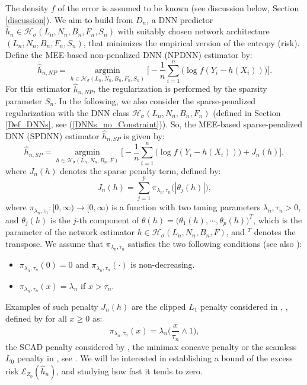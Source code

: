 \documentclass[10pt,twoside]{article}
\numberwithin{equation}{section}
\DeclareMathOperator*{\argmin}{argmin}
\begin{document}
The density $f$ of the error is assumed to be known (see discussion below, Section \ref{discussion}).
%
We aim to build from $D_n$, a DNN predictor $\widehat{h}_n \in \mathcal{H}_{\sigma}(L_n, N_n, B_n, F_n, S_n)$ with suitably chosen network architecture $(L_n, N_n, B_n, F_n, S_n)$,  that minimizes the empirical version of the entropy (risk). 
%
Define the MEE-based non-penalized DNN (NPDNN) estimator by:
%
\begin{equation}\label{Non_Pen_DNNs_Estimators}
\widehat{h}_{n, NP} = \underset{h \in  \mathcal{H}_{\sigma}(L_n, N_n, B_n, F_n, S_n)}{\argmin} \Big[ -\dfrac{1}{n} \sum_{i=1}^{n} \Big(\log f(Y_i - h(X_i)) \Big) \Big].
\end{equation}
%
For this estimator $\widehat{h}_{n, NP}$, the regularization is performed by the sparsity parameter $S_n$. 
In the following, we also consider the sparse-penalized regularization with the DNN class $\mathcal{H}_{\sigma}(L_n, N_n, B_n, F_n)$ (defined in Section \ref{Def_DNNs}, see (\ref{DNNs_no_Constraint})).
%
So, the MEE-based sparse-penalized DNN (SPDNN) estimator $\widehat{h}_{n,SP}$ is given by: 
%
\begin{equation}\label{Pen_DNNs_Estimators_v1}
\widehat{h}_{n,SP} = \underset{h \in  \mathcal{H}_{\sigma}(L_n, N_n, B_n, F)}{\argmin} \Big[ - \dfrac{1}{n} \sum_{i=1}^{n} \Big(\log f(Y_i - h(X_i)) \Big) + J_n(h) \Big],
\end{equation}
%
where $J_{n}(h) $ denotes the sparse penalty term, defined by: 
%
%
\begin{equation}\label{equa_penalty_term_v1}
J_n(h) = \sum_{j=1}^{p} \pi_{\lambda_n, \tau_n} \big( |\theta_j(h)| \big),
\end{equation}
%
where $\pi_{\lambda_n, \tau_n} : [0, \infty) \to [0, \infty)$ is a function with two tuning parameters $\lambda_n, \tau_n > 0$, and $\theta_j(h)$ is the $j$-th component of $\theta(h) = \big(\theta_1(h), \cdots, \theta_p(h) \big)^T$, which is the parameter of the network estimator $h \in \mathcal{H}_{\sigma}(L_n, N_n, B_n, F)$, and $^T$ denotes the transpose.
% 
%
 We assume that $\pi_{\lambda_n, \tau_n}$ satisfies the two following conditions (see also \cite{kurisu2025adaptive}):
%
\begin{itemize}
\item [(i)] $\pi_{\lambda_n, \tau_n}(0) = 0$ and $\pi_{\lambda_n, \tau_n}(\cdot)$ is non-decreasing.
%
\item[(ii)] $\pi_{\lambda_n, \tau_n}(x) = \lambda_n$ if $x > \tau_n$.   
\end{itemize}
%
Examples of such penalty $J_n(h)$ are the clipped $L_1$ penalty considered in \cite{zhang2010analysis}, \cite{ohn2022nonconvex}, defined by for all $x \ge 0$ as:
%
\begin{equation}\label{equa_clipped_L1_penalty}
\pi_{\lambda_n, \tau_n}(x) = \lambda_n \Big(\dfrac{x}{\tau_n} \land 1 \Big), 
\end{equation}
%
the SCAD penalty considered by \cite{fan2001variable}, the minimax concave penalty \cite{zhang2010nearly} or the seamless $L_0$ penalty in \cite{dicker2013variable}, see \cite{kurisu2025adaptive}.
%
% 
%
%
We will be interested in establishing a bound of the excess risk $\mathcal{E}_{Z_0}(\widehat{h}_n)$, and studying how fast it tends to zero. 
\end{document}
